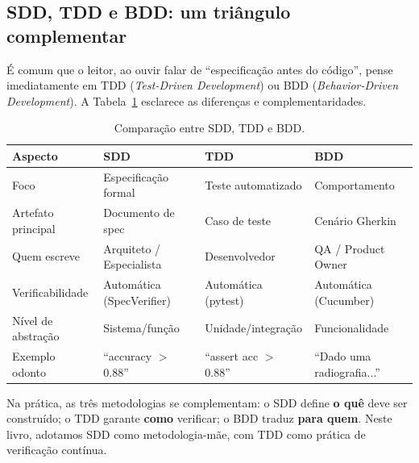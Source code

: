 
\subsection{SDD, TDD e BDD: um triângulo complementar}

É comum que o leitor, ao ouvir falar de ``especificação antes do código'',
pense imediatamente em TDD (\textit{Test-Driven Development}) ou BDD
(\textit{Behavior-Driven Development}). A Tabela~\ref{tab:sdd-tdd-bdd}
esclarece as diferenças e complementaridades.

\begin{table}[H]
  \centering
  \caption{Comparação entre SDD, TDD e BDD.}
  \label{tab:sdd-tdd-bdd}
  \begin{tabularx}{\textwidth}{lXXX}
    \toprule
    \textbf{Aspecto} & \textbf{SDD} & \textbf{TDD} & \textbf{BDD} \\
    \midrule
    Foco & Especificação formal & Teste automatizado & Comportamento \\
    Artefato principal & Documento de spec & Caso de teste & Cenário Gherkin \\
    Quem escreve & Arquiteto / Especialista & Desenvolvedor & QA / Product Owner \\
    Verificabilidade & Automática (SpecVerifier) & Automática (pytest) & Automática (Cucumber) \\
    Nível de abstração & Sistema/função & Unidade/integração & Funcionalidade \\
    Exemplo odonto & ``accuracy $>$ 0.88'' & ``assert acc $>$ 0.88'' & ``Dado uma radiografia...'' \\
    \bottomrule
  \end{tabularx}
\end{table}

Na prática, as três metodologias se complementam: o SDD define \textbf{o quê}
deve ser construído; o TDD garante \textbf{como} verificar; o BDD traduz
\textbf{para quem}. Neste livro, adotamos SDD como metodologia-mãe, com
TDD como prática de verificação contínua.


